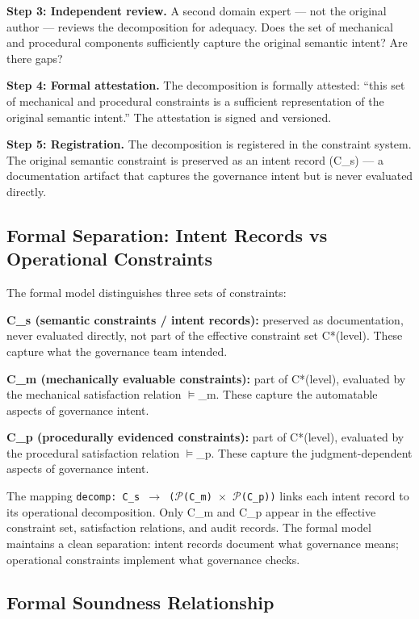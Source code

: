 \textbf{Step 3: Independent review.} A second domain expert --- not the original author --- reviews the decomposition for adequacy. Does the set of mechanical and procedural components sufficiently capture the original semantic intent? Are there gaps?

\textbf{Step 4: Formal attestation.} The decomposition is formally attested: ``this set of mechanical and procedural constraints is a sufficient representation of the original semantic intent.'' The attestation is signed and versioned.

\textbf{Step 5: Registration.} The decomposition is registered in the constraint system. The original semantic constraint is preserved as an intent record (C\_\allowbreak{}s) --- a documentation artifact that captures the governance intent but is never evaluated directly.

\subsection{Formal Separation: Intent Records vs Operational Constraints}


The formal model distinguishes three sets of constraints:

\textbf{C\_\allowbreak{}s (semantic constraints / intent records):} preserved as documentation, never evaluated directly, not part of the effective constraint set C*(level). These capture what the governance team intended.

\textbf{C\_\allowbreak{}m (mechanically evaluable constraints):} part of C*(level), evaluated by the mechanical satisfaction relation $\vDash$\_\allowbreak{}m. These capture the automatable aspects of governance intent.

\textbf{C\_\allowbreak{}p (procedurally evidenced constraints):} part of C*(level), evaluated by the procedural satisfaction relation $\vDash$\_\allowbreak{}p. These capture the judgment-dependent aspects of governance intent.

The mapping \texttt{decomp: C\_\allowbreak{}s $\to$ ($\mathcal{P}$(C\_\allowbreak{}m) $\times$ $\mathcal{P}$(C\_\allowbreak{}p))} links each intent record to its operational decomposition. Only C\_\allowbreak{}m and C\_\allowbreak{}p appear in the effective constraint set, satisfaction relations, and audit records. The formal model maintains a clean separation: intent records document what governance means; operational constraints implement what governance checks.

\subsection{Formal Soundness Relationship}


